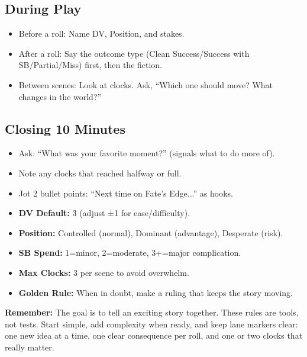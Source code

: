 \subsection{During Play}
\label{subsec:during-play}
\begin{itemize}
\item Before a roll: Name DV, Position, and stakes.
\item After a roll: Say the outcome type (Clean Success/Success with SB/Partial/Miss) first, then the fiction.
\item Between scenes: Look at clocks. Ask, “Which one should move? What changes in the world?”
\end{itemize}

\subsection{Closing 10 Minutes}
\label{subsec:closing-10}
\begin{itemize}
\item Ask: “What was your favorite moment?” (signals what to do more of).
\item Note any clocks that reached halfway or full.
\item Jot 2 bullet points: “Next time on Fate's Edge...” as hooks.
\end{itemize}

\begin{tcolorbox}[title=\textbf{Quick GM Cheat Sheet},colback=green!5,colframe=green!75!black]
\begin{itemize}
\item \textbf{DV Default:} 3 (adjust ±1 for ease/difficulty).
\item \textbf{Position:} Controlled (normal), Dominant (advantage), Desperate (risk).
\item \textbf{SB Spend:} 1=minor, 2=moderate, 3+=major complication.
\item \textbf{Max Clocks:} 3 per scene to avoid overwhelm.
\item \textbf{Golden Rule:} When in doubt, make a ruling that keeps the story moving.
\end{itemize}
\end{tcolorbox}

\vspace{1em}
\noindent\textbf{Remember:} The goal is to tell an exciting story together. These rules are tools, not tests. Start simple, add complexity when ready, and keep lane markers clear: one new idea at a time, one clear consequence per roll, and one or two clocks that really matter.

